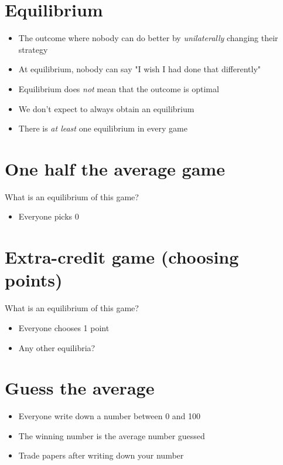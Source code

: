 \documentclass[11pt]{article}
\begin{document}
\section*{Equilibrium}
\label{sec:org28daf5a}
\begin{itemize}
\item The outcome where nobody can do better by \emph{unilaterally} changing their strategy
\item At equilibrium, nobody can say "I wish I had done that differently"
\item Equilibrium does \emph{not} mean that the outcome is optimal
\item We don't expect to always obtain an equilibrium
\item There is \emph{at least} one equilibrium in every game
\end{itemize}

\section*{One half the average game}
\label{sec:orgde41a5e}
What is an equilibrium of this game?
\begin{itemize}
\item Everyone picks 0
\end{itemize}

\section*{Extra-credit game (choosing points)}
\label{sec:orga75c333}
What is an equilibrium of this game?
\begin{itemize}
\item Everyone chooses 1 point
\item Any other equilibria?
\end{itemize}

\section*{Guess the average}
\label{sec:org6e25e0f}
\begin{itemize}
\item Everyone write down a number between 0 and 100
\item The winning number is the average number guessed
\item Trade papers after writing down your number
\end{itemize}
\end{document}
